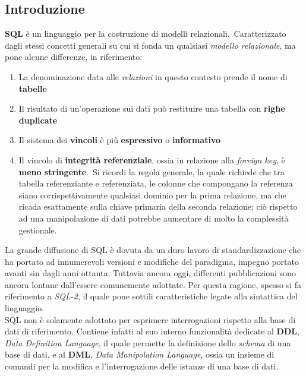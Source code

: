 \documentclass{article}
\begin{document}
\subsection*{Introduzione}
\large
\textbf{SQL} è un linguaggio per la costruzione di modelli relazionali.\ Caratterizzato dagli stessi concetti generali su cui si fonda un qualsiasi \textit{modello relazionale}, ma pone alcune differenze, in riferimento:
\begin{enumerate}
    \renewcommand{\labelenumi}{-} 
    \itemsep0em
    \item La denominazione data alle \textit{relazioni} in questo contesto prende il nome di \textbf{tabelle}
    \item Il risultato di un'operazione sui dati può restituire una tabella con \textbf{righe duplicate}
    \item Il sistema dei \textbf{vincoli} è più \textbf{espressivo} o \textbf{informativo}
    \item Il vincolo di \textbf{integrità referenziale}, ossia in relazione alla \textit{foreign key}, è \textbf{meno stringente}.\ Si ricordi la regola generale, la quale richiede che tra tabella referenziante e referenziata, le colonne che compongano la referenza siano corrispettivamente qualsiasi dominio per la prima relazione, ma che ricada esattamente sulla chiave primaria della seconda relazione; ciò rispetto ad una manipolazione di dati potrebbe aumentare di molto la complessità gestionale.
\end{enumerate}
La grande diffusione di SQL è dovuta da un duro lavoro di standardizzazione che ha portato ad innumerevoli versioni e modifiche del paradigma, impegno portato avanti sin dagli anni ottanta. Tuttavia ancora oggi, differenti pubblicazioni sono ancora lontane dall'essere comunemente adottate. Per questa ragione, spesso si fa riferimento a \textit{SQL-2}, il quale pone sottili caratteristiche legate alla sintattica del linguaggio.\vspace{14pt}\\
SQL non è solamente adottato per esprimere interrogazioni rispetto alla base di dati di riferimento. Contiene infatti al suo interno funzionalità dedicate al \textbf{DDL}, \textit{Data Definition Language}, il quale permette la definizione dello \textit{schema} di una base di dati, e al \textbf{DML}, \textit{Data Manipolation Language}, ossia un insieme di comandi per la modifica e l'interrogazione delle istanze di una base di dati.
\end{document}
